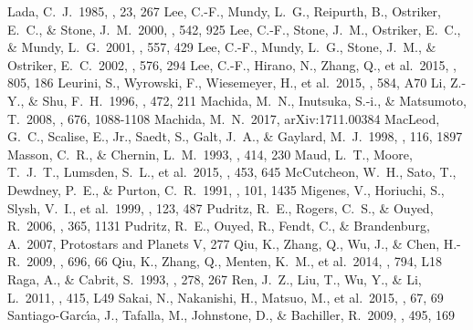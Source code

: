 \documentclass[twocolumn]{aastex61}
\begin{document}
\begin{thebibliography}{}
 Lada, C.~J.\ 1985, \araa, 23, 267 
 Lee, C.-F., Mundy, L.~G., Reipurth, B., Ostriker, E.~C., \& Stone, J.~M.\ 2000, \apj, 542, 925
 Lee, C.-F., Stone, J.~M., Ostriker, E.~C., \& Mundy, L.~G.\ 2001, \apj, 557, 429 
 Lee, C.-F., Mundy, L.~G., Stone, J.~M., \& Ostriker, E.~C.\ 2002, \apj, 576, 294 
 Lee, C.-F., Hirano, N., Zhang, Q., et al.\ 2015, \apj, 805, 186 
 Leurini, S., Wyrowski, F., Wiesemeyer, H., et al.\ 2015, \aap, 584, A70 
 Li, Z.-Y., \& Shu, F.~H.\ 1996, \apj, 472, 211
 Machida, M.~N., Inutsuka, S.-i., \& Matsumoto, T.\ 2008, \apj, 676, 1088-1108 
 Machida, M.~N.\ 2017, arXiv:1711.00384 
 MacLeod, G.~C., Scalise, E., Jr., Saedt, S., Galt, J.~A., \& Gaylard, M.~J.\ 1998, \aj, 116, 1897 
 Masson, C.~R., \& Chernin, L.~M.\ 1993, \apj, 414, 230 
 Maud, L.~T., Moore, T.~J.~T., Lumsden, S.~L., et al.\ 2015, \mnras, 453, 645
 McCutcheon, W.~H., Sato, T., Dewdney, P.~E., \& Purton, C.~R.\ 1991, \aj, 101, 1435 
 Migenes, V., Horiuchi, S., Slysh, V.~I., et al.\ 1999, \apjs, 123, 487
 Pudritz, R.~E., Rogers, C.~S., \& Ouyed, R.\ 2006, \mnras, 365, 1131 
 Pudritz, R.~E., Ouyed, R., Fendt, C., \& Brandenburg, A.\ 2007, Protostars and Planets V, 277
 Qiu, K., Zhang, Q., Wu, J., \& Chen, H.-R.\ 2009, \apj, 696, 66
 Qiu, K., Zhang, Q., Menten, K.~M., et al.\ 2014, \apjl, 794, L18 
 Raga, A., \& Cabrit, S.\ 1993, \aap, 278, 267 
 Ren, J.~Z., Liu, T., Wu, Y., \& Li, L.\ 2011, \mnras, 415, L49 
 Sakai, N., Nakanishi, H., Matsuo, M., et al.\ 2015, \pasj, 67, 69
 Santiago-Garc{\'{\i}}a, J., Tafalla, M., Johnstone, D., \& Bachiller, R.\ 2009, \aap, 495, 169

\end{thebibliography}
\end{document}
